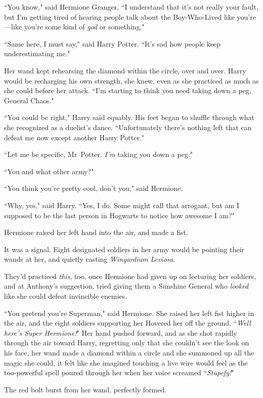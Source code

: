 ``You know," said Hermione Granger, ``I understand that it's not really your fault, but I'm getting tired of hearing people talk about the Boy-Who-Lived like you're—like you're some kind of \emph{god} or something."

``Same here, I must say," said Harry Potter. ``It's sad how people keep underestimating me."

Her wand kept rehearsing the diamond within the circle, over and over. Harry would be recharging his own strength, she knew, even as she practiced as much as she could before her attack. ``I'm starting to think you need taking down a peg, General Chaos."

``You could be right," Harry said equably. His feet began to shuffle through what she recognized as a duelist's dance. ``Unfortunately there's nothing left that can defeat me now except another Harry Potter."

``Let me be specific, Mr~Potter. \emph{I'm} taking you down a peg."

``You and what other army?"

``You think you're pretty cool, don't you," said Hermione.

``Why, yes," said Harry. ``Yes, I do. Some might call that arrogant, but am I supposed to be the last person in Hogwarts to notice how awesome I am?"

Hermione raised her left hand into the air, and made a fist.

It was a signal. Eight designated soldiers in her army would be pointing their wands at her, and quietly casting \emph{Wingardium Leviosa}.

They'd practiced \emph{this}, too, once Hermione had given up on lecturing her soldiers, and at Anthony's suggestion, tried giving them a Sunshine General who \emph{looked} like she could defeat invincible enemies.

``You pretend you're Superman," said Hermione. She raised her left fist higher in the air, and the eight soldiers supporting her Hovered her off the ground. ``\emph{Well here's Super Hermione!}" Her hand pushed forward, and as she shot rapidly through the air toward Harry, regretting only that she couldn't see the look on his face, her wand made a diamond within a circle and she summoned up all the magic she could, it felt like she imagined touching a live wire would feel as the too-powerful spell poured through her when her voice screamed ``\emph{Stupefy!}"

The red bolt burst from her wand, perfectly formed.

